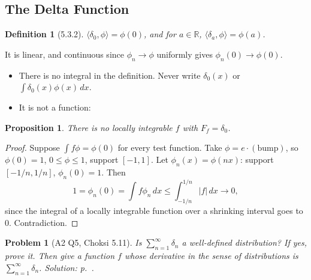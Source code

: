 \documentclass{article}
\newtheorem{definition}{Definition}
\newtheorem{problem}{Problem}
\newtheorem{proposition}{Proposition}
\newcommand{\R}{\mathbb{R}}
\newcommand{\ip}[2]{\langle #1, #2 \rangle}
\begin{document}
\subsection{The Delta Function}
\begin{definition}[5.3.2]
    $\ip{\delta_0}{\phi} = \phi(0)$, and for $a \in \R$, $\ip{\delta_a}{\phi} = \phi(a)$.
\end{definition}
It is linear, and continuous since $\phi_n \to \phi$ uniformly gives $\phi_n(0) \to \phi(0)$.
\begin{itemize}
    \item There is no integral in the definition. Never write $\delta_0(x)$ or $\int \delta_0(x)\phi(x)\,dx$.
    \item It is not a function:
\end{itemize}
\begin{proposition}
    There is no locally integrable $f$ with $F_f = \delta_0$.
\end{proposition}
\begin{proof}
    Suppose $\int f\phi = \phi(0)$ for every test function. Take $\phi = e\cdot(\text{bump})$, so $\phi(0) = 1$, $0 \leq \phi \leq 1$, support $[-1,1]$. Let $\phi_n(x) = \phi(nx)$: support $[-1/n, 1/n]$, $\phi_n(0) = 1$. Then
    \begin{equation}
        1 = \phi_n(0) = \int f\phi_n\,dx \leq \int_{-1/n}^{1/n} |f|\,dx \to 0,
    \end{equation}
    since the integral of a locally integrable function over a shrinking interval goes to $0$. Contradiction.
\end{proof}

\begin{problem}[A2 Q5, Choksi 5.11]\label{prob:a2-511}
    Is $\sum_{n=1}^\infty \delta_n$ a well-defined distribution? If yes, prove it. Then give a function $f$ whose derivative in the sense of distributions is $\sum_{n=1}^\infty\delta_n$.
    \hfill \emph{Solution: p.~\pageref{sol:a2-511}.}
\end{problem}
\end{document}
